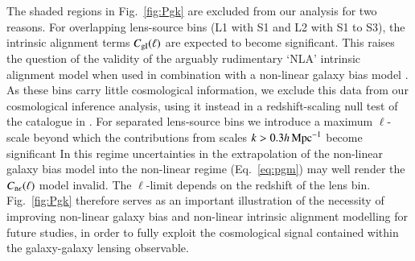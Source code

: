 The shaded regions in Fig.~\ref{fig:Pgk} are excluded from our analysis for two reasons.   For overlapping lens-source bins (L1 with S1 and L2 with S1 to S3), the intrinsic alignment terms $C_{\rm gI}(\ell)$ are expected to become significant.   This raises the question of the validity of the arguably rudimentary `NLA' intrinsic alignment model when used in combination with a non-linear galaxy bias model \citep[see][for a self-consistent pertubative approach to both intrinsic alignment and galaxy bias modelling]{blazek/etal:2019}.   As these bins carry little cosmological information, we exclude this data from our cosmological inference analysis, using it instead in a redshift-scaling null test of the catalogue in \citet{giblin/etal:inprep}.   For separated lens-source bins we introduce a maximum $\ell$-scale beyond which the contributions from scales $k > 0.3 h \,{\rm Mpc}^{-1}$ become significant \citep[see figure 2 in][]{joachimi/etal:inprep}  In this regime uncertainties in the extrapolation of the \citet{sanchez/etal:2017} non-linear galaxy bias model into the non-linear regime (Eq.~\ref{eq:pgm}) may well render the $C_{\rm n \epsilon}(\ell)$ model invalid.   The $\ell$-limit depends on the redshift of the lens bin.    Fig.~\ref{fig:Pgk} therefore serves as an important illustration of the necessity of improving non-linear galaxy bias and non-linear intrinsic alignment modelling for future studies, in order to fully exploit the cosmological signal contained within the galaxy-galaxy lensing observable.


